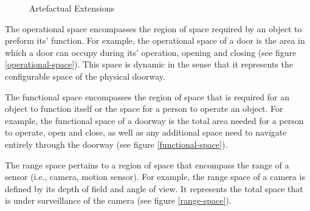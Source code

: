 \documentclass[12pt]{ucthesis}
\begin{document}
\begin{figure}[H]
 \centering
 \hspace{7 mm}
  \hspace{7 mm}
 \caption{Artefactual Extensions}
\label{artefactual-extensions}
\end{figure}

The operational space encompasses the region of space required by an object to preform its' function. For example, the operational space of a door is the area in which a door can occupy during its' operation, opening and closing (see figure \ref{operational-space}). This space is dynamic in the sense that it represents the configurable space of the physical doorway. 

The functional space encompasses the region of space that is required for an object to function itself or the space for a person to operate an object. For example, the functional space of a doorway is the total area needed for a person to operate, open and close, as well as any additional space need to navigate entirely through the doorway (see figure \ref{functional-space}). 

The range space pertains to a region of space that encompass the range of a sensor (i.e., camera, motion sensor). For example, the range space of a camera is defined by its depth of field and angle of view. It represents the total space that is under surveillance of the camera (see figure \ref{range-space}).
\end{document}
